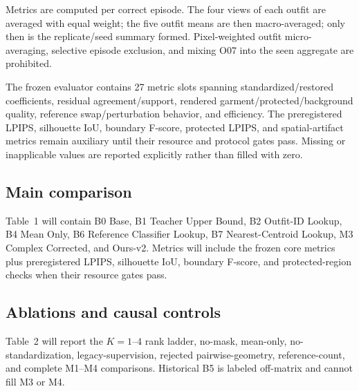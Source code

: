 Metrics are computed per correct episode. The four views of each outfit are averaged with equal weight; the five outfit means are then macro-averaged; only then is the replicate/seed summary formed. Pixel-weighted outfit micro-averaging, selective episode exclusion, and mixing O07 into the seen aggregate are prohibited.

The frozen evaluator contains 27 metric slots spanning standardized/restored coefficients, residual agreement/support, rendered garment/protected/background quality, reference swap/perturbation behavior, and efficiency. The preregistered LPIPS, silhouette IoU, boundary F-score, protected LPIPS, and spatial-artifact metrics remain auxiliary until their resource and protocol gates pass. Missing or inapplicable values are reported explicitly rather than filled with zero.

\subsection{Main comparison}

Table~1 will contain B0 Base, B1 Teacher Upper Bound, B2 Outfit-ID Lookup, B4 Mean Only, B6 Reference Classifier Lookup, B7 Nearest-Centroid Lookup, M3 Complex Corrected, and Ours-v2. Metrics will include the frozen core metrics plus preregistered LPIPS, silhouette IoU, boundary F-score, and protected-region checks when their resource gates pass.


\subsection{Ablations and causal controls}

Table~2 will report the $K=1$--$4$ rank ladder, no-mask, mean-only, no-standardization, legacy-supervision, rejected pairwise-geometry, reference-count, and complete M1--M4 comparisons. Historical B5 is labeled off-matrix and cannot fill M3 or M4.


